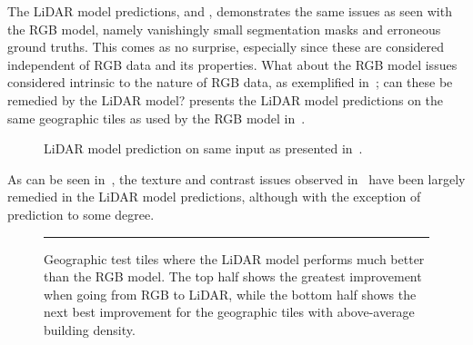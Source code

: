 The LiDAR model predictions,  and , demonstrates the same issues as seen with the RGB model, namely vanishingly small segmentation masks and erroneous ground truths.
This comes as no surprise, especially since these are considered independent of RGB data and its properties.
What about the RGB model issues considered intrinsic to the nature of RGB data, as exemplified in~; can these be remedied by the LiDAR model?
 presents the LiDAR model predictions on the same geographic tiles as used by the RGB model in~. %

\begin{figure}[H]
  \centering
  \caption{%
    LiDAR model prediction on same input as presented in~.
  }%
  \label{fig:lidar-corrected-rgb}
\end{figure}

As can be seen in~, the texture and contrast issues observed in~ have been largely remedied in the LiDAR model predictions, although with the exception of prediction  to some degree.

\begin{figure}[H]
  \centering
  \rule[1ex]{\textwidth}{.5pt}
  \caption{%
    Geographic test tiles where the LiDAR model performs much better than the RGB model.
    The top half shows the greatest improvement when going from RGB to LiDAR, while the bottom half shows the next best improvement for the geographic tiles with above-average building density.
  }%
  \label{fig:lidar-better-than-rgb}
\end{figure}

